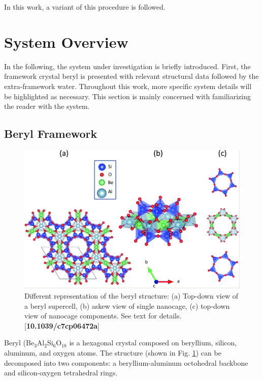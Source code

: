             In this work, a variant of this procedure is followed.

    \section{System Overview}
    
    In the following, the system under investigation is briefly introduced. First, the framework crystal beryl is presented with relevant structural data followed by the extra-framework water. Throughout this work, more specific system details will be highlighted as necessary. This section is mainly concerned with familiarizing the reader with the system.
    
        \subsection{Beryl Framework}
        
        \begin{figure}
            \centering
            \includegraphics[width=0.9\linewidth]{Figures/System/beryl_structure.png}
            \caption{Different representation of the beryl structure: (a) Top-down view of a beryl supercell, (b) askew view of single nanocage, (c) top-down view of nanocage components. See text for details. [\textbf{10.1039/c7cp06472a}]}
            \label{fig:beryl_structure}
        \end{figure}
        
        Beryl (Be$_3$Al$_2$Si$_6$O$_18$ is a hexagonal crystal composed on beryllium, silicon, aluminum, and oxygen atoms. The structure (shown in Fig. \ref{fig:beryl_structure}) can be decomposed into two components: a beryllium-aluminum octohedral backbone and silicon-oxygen tetrahedral rings. 
        

